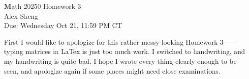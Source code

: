 \documentclass[]{book}
\theoremstyle{definition}
\newcommand{\0}{\mathbf{0}}
\begin{document}
\begin{center}
{\Large\textbf Math 20250 \hspace{0.5cm} Homework 3}\\
\large{Alex Sheng}\\
\normalsize{Due: Wednesday Oct 21, 11:59 PM CT}
\end{center}

\vspace{0.2 cm}

First I would like to apologize for this rather messy-looking Homework 3——typing matrices in LaTex is just too much work. I switched to handwriting, and my handwriting is quite bad. I hope I wrote every thing clearly enough to be seen, and apologize again if some places might need close examinations.

\begin{enumerate}[label=\arabic*\degree]


\end{enumerate}
\end{document}
